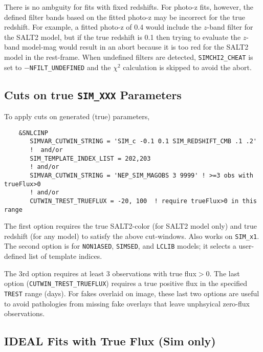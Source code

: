 \documentclass[12pt]{article}
\begin{document}
There is no ambguity for fits with fixed redshifts.
For photo-z fits, however, the defined filter bands based
on the fitted photo-z may be incorrect for the true redshift.
For example, a fitted photo-z of 0.4 would include the
$z$-band filter for the SALT2 model, 
but if the true redshift is 0.1 then trying to evaluate
the $z$-band model-mag would result in an abort because
it is too red for the SALT2 model in the rest-frame.
When undefined filters are detected,
{\tt SIMCHI2\_CHEAT}  is set to $-${\tt NFILT\_UNDEFINED}
and the $\chi^2$ calculation is skipped to avoid the abort.


\subsection{Cuts on true {\tt SIM\_XXX} Parameters}
\label{subsec:SIMVAR_CUTS}

To apply cuts on generated (true) parameters,
\begin{verbatim}
    &SNLCINP
       SIMVAR_CUTWIN_STRING = 'SIM_c -0.1 0.1 SIM_REDSHIFT_CMB .1 .2'
       !  and/or
       SIM_TEMPLATE_INDEX_LIST = 202,203
       ! and/or
       SIMVAR_CUTWIN_STRING = 'NEP_SIM_MAGOBS 3 9999' ! >=3 obs with trueFlux>0
       ! and/or
       CUTWIN_TREST_TRUEFLUX = -20, 100  ! require trueFlux>0 in this range

\end{verbatim}
%
The first option requires the true SALT2-color (for SALT2 model only)
and true redshift (for any model) to satisfy
the above cut-windows.  Also works on {\tt SIM\_x1}.
The second option is for {\tt NON1ASED}, {\tt SIMSED}, and {\tt LCLIB}
models; it selects a user-defined list of template indices.

The 3rd option requires at least 3 observations with true flux$>0$.
The last option ({\tt CUTWIN\_TREST\_TRUEFLUX}) requires
a true positive flux in the specified {\tt TREST} range (days).
For fakes overlaid on image,  these last two options are useful 
to avoid pathologies from missing fake overlays that leave 
unphsyical zero-flux observations.


\clearpage
\subsection{IDEAL Fits with True Flux (Sim only) }
\label{subsec:IDEAL}
\end{document}
